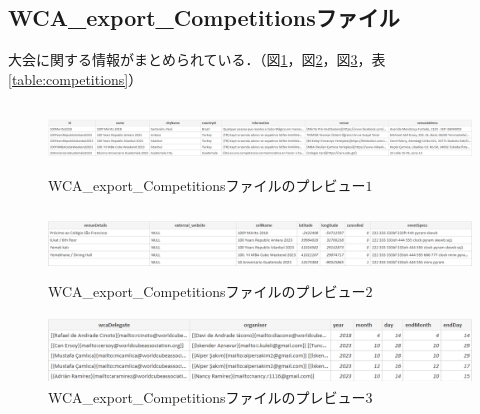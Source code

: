 \documentclass{article}
\begin{document}
  \subsection{WCA\_export\_Competitionsファイル}

  大会に関する情報がまとめられている．（図\ref{figure:competitions1}，図\ref{figure:competitions2}，図\ref{figure:competitions3}，表\ref{table:competitions}）\par

  \begin{figure}[h]
    \centering
    \includegraphics[height=18mm]{competitions1.png}
    \caption{WCA\_export\_Competitionsファイルのプレビュー$ 1 $}
    \label{figure:competitions1}
  \end{figure}
  \begin{figure}[h]
    \centering
    \includegraphics[height=18mm]{competitions2.png}
    \caption{WCA\_export\_Competitionsファイルのプレビュー$ 2 $}
    \label{figure:competitions2}
  \end{figure}
  \begin{figure}[h]
    \centering
    \includegraphics[height=18mm]{competitions3.png}
    \caption{WCA\_export\_Competitionsファイルのプレビュー$ 3 $}
    \label{figure:competitions3}
  \end{figure}
\end{document}
